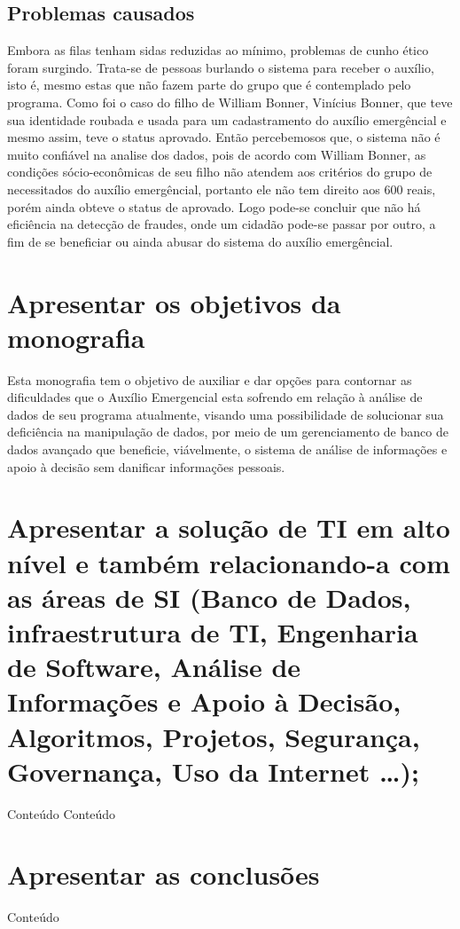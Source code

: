\documentclass[12pt]{article}
\begin{document}
\subsection{Problemas causados}
	Embora as filas tenham sidas reduzidas ao mínimo, problemas de cunho ético foram surgindo. Trata-se de pessoas burlando o sistema para receber o auxílio, isto é, mesmo estas que não fazem parte do grupo que é contemplado pelo programa. Como foi o caso do filho de William Bonner, Vinícius Bonner, que teve sua identidade roubada e usada para um cadastramento do auxílio emergêncial e mesmo assim, teve o status aprovado.
\linebreak
\linebreak
	Então percebemosos que, o sistema não é muito confiável na analise dos dados, pois de acordo com William Bonner, as condições sócio-econômicas de seu filho não atendem aos critérios do grupo de necessitados do auxílio emergêncial, portanto ele não tem direito aos 600 reais, porém ainda obteve o status de aprovado. Logo pode-se concluir que não há eficiência na detecção de fraudes, onde um cidadão pode-se passar por outro, a fim de se beneficiar ou ainda abusar do sistema do auxílio emergêncial. 
\section{Apresentar os objetivos da monografia}
	Esta monografia tem o objetivo de auxiliar e dar opções para contornar as dificuldades que o Auxílio Emergencial esta sofrendo em relação à análise de dados de seu programa atualmente, visando uma possibilidade de solucionar sua deficiência na manipulação de dados, por meio de um gerenciamento de banco de dados avançado que beneficie, viávelmente, o sistema de análise de informações e apoio à decisão sem danificar informações pessoais.

\section{Apresentar a solução de TI em alto nível e também relacionando-a com as áreas de SI (Banco de Dados, infraestrutura de TI, Engenharia de Software, Análise de Informações e Apoio à Decisão, Algoritmos, Projetos, Segurança, Governança, Uso da Internet …);}
Conteúdo
\linebreak
\linebreak
Conteúdo

\section{Apresentar as conclusões}
Conteúdo
\end{document}

